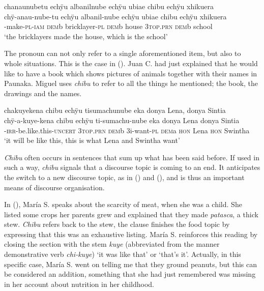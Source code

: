 \ea\label{ex:chibu-9}
\begingl
\glpreamble chanaunubetu echÿu albanilnube echÿu ubiae chibu echÿu xhikuera\\
\gla chÿ-anau-nube-tu echÿu albanil-nube echÿu ubiae chibu echÿu xhikuera\\
-make-\textsc{pl}-\textsc{iam} \textsc{dem}b bricklayer-\textsc{pl} \textsc{dem}b house 3\textsc{top.prn} \textsc{dem}b school\\
\glft ‘the bricklayers made the house, which is the school’
\endgl
\trailingcitation{[mxx-p110825l.116]}
\xe

The pronoun can not only refer to a single aforementioned item, but also to whole situations. This is the case in (). Juan C. had just explained that he would like to have a book which shows pictures of animals together with their names in Paunaka. Miguel uses \textit{chibu} to refer to all the things he mentioned; the book, the drawings and the names.


\ea\label{ex:chibu-10}
\begingl
\glpreamble chakuyekena chibu echÿu tisumachunube eka donya Lena, donya Sintia\\
\gla chÿ-a-kuye-kena chibu echÿu ti-sumachu-nube eka donya Lena donya Sintia\\
-\textsc{irr}-be.like.this-\textsc{uncert} 3\textsc{top.prn} \textsc{dem}b 3i-want-\textsc{pl} \textsc{dem}a \textsc{hon} Lena \textsc{hon} Swintha\\
\glft ‘it will be like this, this is what Lena and Swintha want’
\endgl
\trailingcitation{[mqx-p110826l.685-688]}
\xe

\textit{Chibu} often occurs in sentences that sum up what has been said before. If used in such a way, \textit{chibu} signals that a discourse topic is coming to an end. It anticipates the switch to a new discourse topic, as in () and (), and is thus an important means of discourse organisation.

In (), María S. speaks about the scarcity of meat, when she was a child. She listed some crops her parents grew and explained that they made \textit{patasca}, a thick stew. \textit{Chibu} refers back to the stew, the clause finishes the food topic by expressing that this was an exhaustive listing. María S. reinforces this reading by closing the section with the stem \textit{kuye} (abbreviated from the manner demonstrative verb \textit{chi-kuye}) ‘it was like that’ or ‘that’s it’. Actually, in this specific case, María S. went on telling me that they ground peanuts, but this can be considered an addition, something that she had just remembered was missing in her account about nutrition in her childhood.

